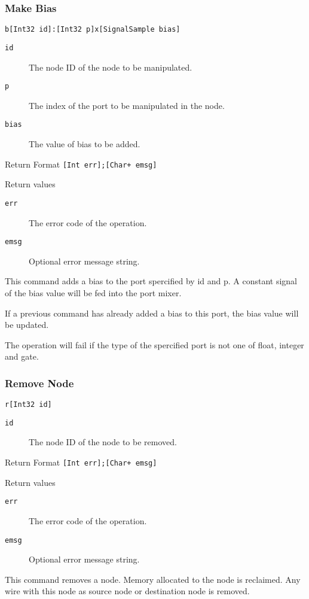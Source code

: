 \documentclass{report}
\newcommand{\inlinecode}[1]{\begin{mdframed}[backgroundcolor=black!10]#1\end{mdframed}}
\begin{document}
\subsubsection{Make Bias}
\inlinecode{
\begin{description}\sloppy
\item[Command Format] \lstinline{b[Int32 id]:[Int32 p]x[SignalSample bias]}
\item[Command Arguments]\hfill
  \begin{description}
  \item[\texttt{id}] The node ID of the node to be manipulated.
  \item[\texttt{p}] The index of the port to be manipulated in the node.
  \item[\texttt{bias}] The value of bias to be added.
  \end{description}
\item[Return Format] \lstinline|[Int err];[Char+ emsg]|
\item[Return values]\hfill
  \begin{description}
  \item[\texttt{err}] The error code of the operation.
  \item[\texttt{emsg}] Optional error message string.
  \end{description}
\end{description}}\par
This command adds a bias to the port spercified by id and p. A constant signal of the bias value will be fed into the port mixer.\par
If a previous command has already added a bias to this port, the bias value will be updated.\par
The operation will fail if the type of the spercified port is not one of float, integer and gate.
\subsubsection{Remove Node}
\inlinecode{
\begin{description}\sloppy
\item[Command Format] \lstinline{r[Int32 id]}
\item[Command Arguments]\hfill
  \begin{description}
  \item[\texttt{id}] The node ID of the node to be removed.
  \end{description}
\item[Return Format] \lstinline|[Int err];[Char+ emsg]|
\item[Return values]\hfill
  \begin{description}
  \item[\texttt{err}] The error code of the operation.
  \item[\texttt{emsg}] Optional error message string.
  \end{description}
\end{description}}\par
This command removes a node. Memory allocated to the node is reclaimed. Any wire with this node as source node or destination node is removed.
\end{document}
